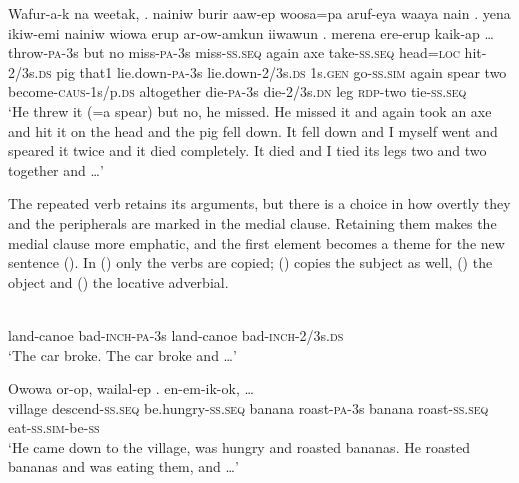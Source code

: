 \ea%
\label{ex:x1505}
\gll Wafur-a-k  na  weetak,  .   nainiw  burir  aaw-ep  woosa=pa  aruf-eya  waaya nain  .    yena  ikiw-emi  nainiw wiowa  erup  ar-ow-amkun  iiwawun  .   merena  ere-erup  kaik-ap  {\dots}\\
throw-\textsc{pa}-3s  but  no  miss-\textsc{pa}-3s  miss-\textsc{ss}.\textsc{seq} again  axe  take-\textsc{ss}.\textsc{seq} head=\textsc{loc} hit-2/3s.\textsc{ds} pig that1 lie.down-\textsc{pa}-3s lie.down-2/3s.\textsc{ds} 1s.\textsc{gen} go-\textsc{ss}.\textsc{sim} again spear  two  become-\textsc{caus}-1s/p.\textsc{ds} altogether die-\textsc{pa}-3s die-2/3s.\textsc{dn} leg \textsc{rdp}-two  tie-\textsc{ss}.\textsc{seq}\\
\glt`He threw it (=a spear) but no, he missed. He missed it and again took an axe and hit it on the head and the pig fell down. It fell down and I myself went and speared it twice and it died completely. It died and I tied its legs two and two together and {\dots}'
\z


The repeated verb retains its arguments, but there is a choice in how overtly they and the peripherals are marked in the medial clause. Retaining them makes the medial clause more emphatic, and the first element becomes a theme for the new sentence (). In () only the verbs are copied; () copies the subject as well, () the object and () the locative adverbial.

\ea%
\label{ex:x1506}
\gll {}      \\
land-canoe  bad-\textsc{inch}-\textsc{pa}-3s land-canoe bad-\textsc{inch}-2/3s.\textsc{ds}\\
\glt`The car broke. The car broke and {\dots}'
\z


\ea%
\label{ex:x1507}
\gll Owowa  or-op,  wailal-ep   .    en-em-ik-ok, {\dots} \\
village  descend-\textsc{ss}.\textsc{seq} be.hungry-\textsc{ss}.\textsc{seq} banana  roast-\textsc{pa}-3s banana roast-\textsc{ss}.\textsc{seq}  eat-\textsc{ss}.\textsc{sim}-be-\textsc{ss}\\
\glt`He came down to the village, was hungry and roasted bananas. He roasted bananas and was eating them, and {\dots}'
\z



